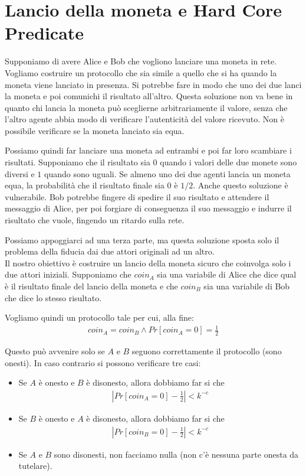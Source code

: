 \setchapterpreamble[u]{\margintoc}
\chapter{Lancio della moneta e Hard Core Predicate}

Supponiamo di avere Alice e Bob che vogliono lanciare una moneta in rete. Vogliamo costruire un protocollo che sia simile a quello che si ha quando la moneta viene lanciato in presenza. Si potrebbe fare in modo che uno dei due lanci la moneta e poi comunichi il risultato all'altro. Questa soluzione non va bene in quanto chi lancia la moneta può sceglierne arbitrariamente il valore, senza che l'altro agente abbia modo di verificare l'autenticità del valore ricevuto. Non è possibile verificare se la moneta lanciato sia equa.

Possiamo quindi far lanciare una moneta ad entrambi e poi far loro scambiare i risultati. Supponiamo che il risultato sia $0$ quando i valori delle due monete sono diversi e $1$ quando sono uguali. Se almeno uno dei due agenti lancia un moneta equa, la probabilità che il risultato finale sia $0$ è $1/2$. Anche questo soluzione è vulnerabile. Bob potrebbe fingere di spedire il suo risultato e attendere il messaggio di Alice, per poi forgiare di conseguenza il suo messaggio e indurre il risultato che vuole, fingendo un ritardo sulla rete. 

Possiamo appoggiarci ad una terza parte, ma questa soluzione sposta solo il problema della fiducia dai due attori originali ad un altro.\\

\noindent Il nostro obiettivo è costruire un lancio della moneta sicuro che coinvolga solo i due attori iniziali. Supponiamo che $coin_A$ sia una variabile di Alice che dice qual è il risultato finale del lancio della moneta e che $coin_B$ sia una variabile di Bob che dice lo stesso risultato. 

Vogliamo quindi un protocollo tale per cui, alla fine:
\begin{align*}
    coin_A = coin_B \land Pr[coin_A = 0] = \frac{1}{2}
\end{align*}

\noindent Questo può avvenire solo se $A$ e $B$ seguono correttamente il protocollo (sono onesti). In caso contrario si possono verificare tre casi:
\begin{itemize}
    \item Se $A$ è onesto e $B$ è disonesto, allora dobbiamo far si che
    \begin{align*}
        \left| Pr[coin_A = 0] - \frac{1}{2}\right| < k^{-c}
    \end{align*}
     \item Se $B$ è onesto e $A$ è disonesto, allora dobbiamo far si che
    \begin{align*}
        \left| Pr[coin_B = 0] - \frac{1}{2}\right| < k^{-c}
    \end{align*}
    \item Se $A$ e $B$ sono disonesti, non facciamo nulla (non c'è nessuna parte onesta da tutelare).
\end{itemize}

